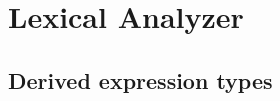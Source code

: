 \chapter{Lexical Analyzer}
\label{lexical-analyzer}

\section{Derived expression types}
\label{derivedsection}
